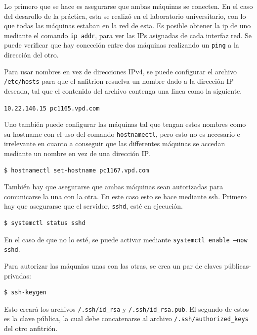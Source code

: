 \documentclass[spanish]{article}
\begin{document}
Lo primero que se hace es asegurarse que ambas máquinas se conecten.
En el caso del desarollo de la práctica, esta se realizó en el laboratorio universitario,
con lo que todas las máquinas estaban en la red de esta.
Es posible obtener la ip de uno mediante el comando \texttt{ip addr},
para ver las IPs asignadas de cada interfaz red.
Se puede verificar que hay conección entre dos máquinas realizando un \texttt{ping} a la dirección del otro.

Para usar nombres en vez de direcciones IPv4, se puede configurar el archivo \texttt{/etc/hosts} para que
el anfitrion resuelva un nombre dado a la dirección IP deseada,
tal que el contenido del archivo contenga una linea como la siguiente.

\texttt{10.22.146.15 pc1165.vpd.com}

Uno también puede configurar las máquinas tal que tengan estos
nombres como su hostname con el uso del comando \texttt{hostnamectl},
pero esto no es necesario e irrelevante en cuanto a conseguir que las
differentes máquinas se accedan mediante un nombre en vez de una dirección IP.

\begin{lstlisting}[language=bash,breaklines=true]
$ hostnamectl set-hostname pc1167.vpd.com
\end{lstlisting}

También hay que asegurarse que ambas máquinas sean autorizadas para comunicarse la una con la otra.
En este caso esto se hace mediante ssh. Primero hay que asegurarse que el servidor, \texttt{sshd}, esté en ejecución.

\begin{lstlisting}[language=bash,breaklines=true]
$ systemctl status sshd
\end{lstlisting}

En el caso de que no lo esté, se puede activar mediante \texttt{systemctl enable --now sshd}.

Para autorizar las máqunias unas con las otras, se crea un par de claves públicas-privadas:

\begin{lstlisting}[language=bash,breaklines=true]
$ ssh-keygen
\end{lstlisting}

Esto creará los archivos \texttt{{\texttildelow}/.ssh/id\_rsa} y \texttt{\texttildelow/.ssh/id\_rsa.pub}. El segundo de estos es la
clave pública, la cual debe concatenarse al archivo \texttt{\texttildelow/.ssh/authorized\_keys} del otro anfitrión.
\end{document}
